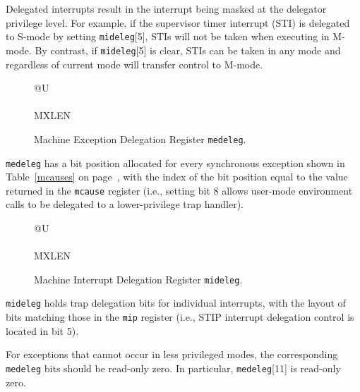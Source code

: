 Delegated interrupts result in the interrupt being masked at the delegator
privilege level.  For example, if the supervisor timer interrupt (STI) is
delegated to S-mode by setting {\tt mideleg}[5], STIs will not be taken when
executing in M-mode.  By contrast, if {\tt mideleg}[5] is clear, STIs can
be taken in any mode and regardless of current mode will transfer control to
M-mode.

\begin{figure}[h!]
{\footnotesize
\begin{center}
\begin{tabular}{@{}U}
 \\
\hline
{} \\
\hline
MXLEN \\
\end{tabular}
\end{center}
}
\vspace{-0.1in}
\caption{Machine Exception Delegation Register {\tt medeleg}.}
\label{medelegreg}
\end{figure}

{\tt medeleg} has a bit position allocated for every synchronous exception
shown in Table~\ref{mcauses} on page~\pageref{mcauses}, with the index of the bit position equal to the
value returned in the {\tt mcause} register (i.e., setting bit 8 allows
user-mode environment calls to be delegated to a lower-privilege trap
handler).

\begin{figure}[h!]
{\footnotesize
\begin{center}
\begin{tabular}{@{}U}
 \\
\hline
{} \\
\hline
MXLEN \\
\end{tabular}
\end{center}
}
\vspace{-0.1in}
\caption{Machine Interrupt Delegation Register {\tt mideleg}.}
\label{midelegreg}
\end{figure}

{\tt mideleg} holds trap delegation bits for individual interrupts, with the
layout of bits matching those in the {\tt mip} register (i.e., STIP interrupt
delegation control is located in bit 5).

For exceptions that cannot occur in less privileged modes, the corresponding
{\tt medeleg} bits should be read-only zero.  In particular,
{\tt medeleg}[11] is read-only zero.

